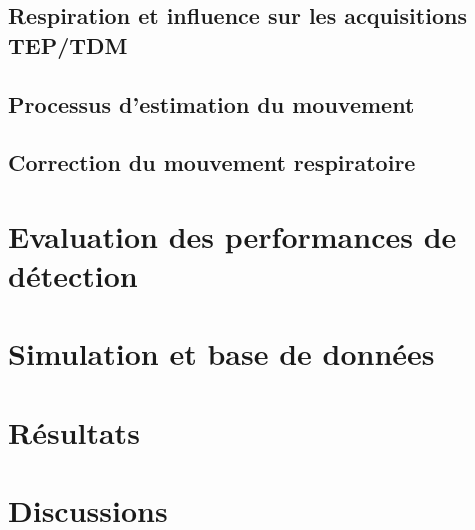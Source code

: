 \documentclass[12pt]{book}
\begin{document}
	\chapter{Respiration et influence sur les acquisitions TEP/TDM}
	
	
	\chapter{Processus d'estimation du mouvement}
	
	
	\chapter{Correction du mouvement respiratoire}
	

\part{Evaluation des performances de détection}
	



\part{Simulation et base de données}
	

	



\part{Résultats}
	


\part{Discussions}

	


\newpage
{}




\listoffigures


\listoftables





\end{document}
